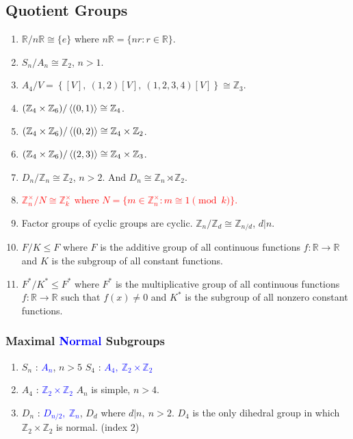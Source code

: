 \subsection{Quotient Groups}
\begin{enumerate}
	\item $\mathbb{R}/n\mathbb{R} \cong \{ e \}$ where $n\mathbb{R} = \{ nr : r \in \mathbb{R} \}$.
	\item $S_n/A_n \cong \mathbb{Z}_2$, $n>1$.
	\item $A_4/V  = \left\{ [V],\ (1,2)[V],\ (1,2,3,4)[V] \right\} \cong \mathbb{Z}_3$.
	\item $(\mathbb{Z}_4 \times \mathbb{Z}_6)/\left\langle (0,1) \right\rangle \cong \mathbb{Z}_4$.
	\item $(\mathbb{Z}_4 \times \mathbb{Z}_6)/\left\langle (0,2) \right\rangle \cong \mathbb{Z}_4 \times \mathbb{Z}_2$.
	\item $(\mathbb{Z}_4 \times \mathbb{Z}_6)/\left\langle (2,3) \right\rangle \cong \mathbb{Z}_4 \times \mathbb{Z}_3$.
	\item $D_n/\mathbb{Z}_n \cong \mathbb{Z}_2$, $n>2$. And $D_n \cong \mathbb{Z}_n \rtimes \mathbb{Z}_2$.
	\item \textcolor{red}{$\mathbb{Z}_n^\times/N \cong \mathbb{Z}_k^\times$ where $N = \{ m \in \mathbb{Z}_n^\times : m \cong 1 \pmod{k} \}$.}
	\item Factor groups of cyclic groups are cyclic. $\mathbb{Z}_n/\mathbb{Z}_d \cong \mathbb{Z}_{n/d}$, $d|n$.
	\item $F/K \le F$ where $F$ is the additive group of all continuous functions $f : \mathbb{R} \to \mathbb{R}$ and $K$ is the subgroup of all constant functions.
	\item $F^\ast/K^\ast \le F^\ast$ where $F^\ast$ is the multiplicative group of all continuous functions $f : \mathbb{R} \to \mathbb{R}$ such that $f(x) \ne 0$ and $K^\ast$ is the subgroup of all nonzero constant functions.
\end{enumerate}

\subsubsection{Maximal \textcolor{blue}{Normal} Subgroups}
\begin{enumerate}
	\item $S_n$ : \textcolor{blue}{$A_n$}, $n > 5$
		\subitem $S_4$ : \textcolor{blue}{$A_4,\ \mathbb{Z}_2 \times \mathbb{Z}_2$}
	\item $A_4$ : \textcolor{blue}{$\mathbb{Z}_2 \times \mathbb{Z}_2$}
		\subitem $A_n$ is simple, $n > 4$.
	\item $D_n$ : \textcolor{blue}{$D_{n/2},\ \mathbb{Z}_n$}, $D_d$ where $d|n,\ n>2$.
		\subitem $D_4$ is the only dihedral group in which $\mathbb{Z}_2 \times \mathbb{Z}_2$ is normal. (index $2$)
\end{enumerate}

